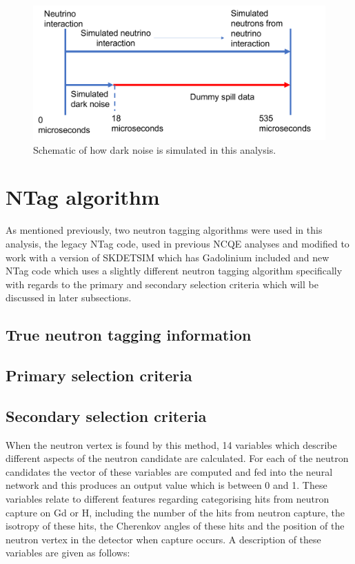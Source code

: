 \begin{figure}

    \includegraphics[width=\textwidth]{Figures/dark_rate_schematic.png}
    \caption{Schematic of how dark noise is simulated in this analysis.}
    \label{fig:dark_rate_schematic}

\end{figure}


\section{NTag algorithm}

As mentioned previously, two neutron tagging algorithms were used in this analysis, the legacy NTag code, used in previous NCQE analyses and modified to work with a version of SKDETSIM which has Gadolinium included and new NTag code which uses a slightly different neutron tagging algorithm specifically with regards to the primary and secondary selection criteria which will be discussed in later subsections.


\subsection{True neutron tagging information}



\subsection{Primary selection criteria}
\subsection{Secondary selection criteria}
When the neutron vertex is found by this method, 14 variables which describe different aspects of the neutron candidate are calculated. For each of the neutron candidates the vector of these variables are computed and fed into the neural network and this produces an output value which is between 0 and 1. These variables relate to different features regarding categorising hits from neutron capture on Gd or H, including the number of the hits from neutron capture, the isotropy of these hits, the Cherenkov angles of these hits and the position of the neutron vertex in the detector when capture occurs. A description of these variables are given as follows:


